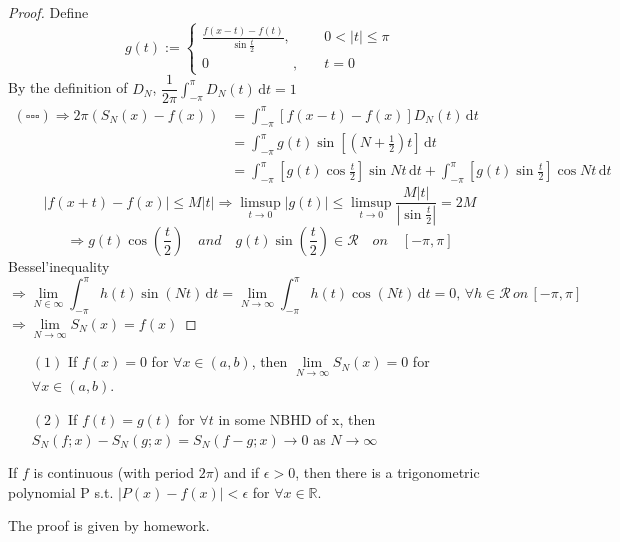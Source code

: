   \begin{proof}
    Define 
    \[g(t):=\left\{
        \begin{aligned}
            \frac{f(x-t)-f(t)}{\sin{\frac{t }{2 }}},&\quad0<|t| \leqslant \pi\\
            0\qquad\qquad\qquad,&\quad t=0
        \end{aligned}
    \right.\]
    By the definition of  $ D_N $,  $ \dfrac{1 }{2\pi}\int_{-\pi }^{\pi } D_N(t)\, \mathrm{d}t=1   $  
    \begin{align*}
        (\square\square\square)\Rightarrow 2\pi(S_N(x)-f(x))&=\int_{-\pi }^{\pi } [f(x-t)-f(x)]D_N(t)\, \mathrm{d}t\\
        &=\int_{-\pi}^{\pi }g(t)\sin[(N+\frac{1 }{2})t]\, \mathrm{d}t\\
        &=\int_{-\pi }^{\pi  }[g(t)\cos{\frac{t}{2}}]\sin{Nt} \, \mathrm{d}t+\int_{-\pi }^{\pi }[g(t)\sin{\frac{t}{2}}]\cos{Nt} \, \mathrm{d}t        
    \end{align*}
    \[|f(x+t)-f(x)| \leqslant M|t|\Rightarrow \limsup\limits_{t\to0}|g(t)| \leqslant \limsup\limits_{t\to0}\frac{M|t|}{|\sin{\frac{t }{2 }}|}=2M\]
    \[\Rightarrow g(t)\cos(\frac{t }{2})\quad and \quad g(t)\sin(\frac{ t}{2})\in \mathscr{R }\quad
    on\quad [-\pi, \pi]\]
    Bessel'inequality \[ \Rightarrow \lim\limits_{N\in\infty} \int_{-\pi }^{\pi } h(t)\sin(Nt)\, \mathrm{d}t=\lim\limits_{N\to\infty } \int_{-\pi}^{\pi } h(t)\cos(N t)\, \mathrm{d}t=0,\,\forall h\in\mathscr{R }\,on\,[-\pi,\pi]       \]
     $ \Rightarrow \lim\limits_{N\to\infty } S_N(x)=f(x)  $  
  \end{proof}
  \begin{corollary}
    \begin{enumerate}
        \item[$ (1) $] If $ f(x)=0  $ for  $ \forall x\in(a,b) $, then  $ \lim\limits_{N\to\infty } S_N(x)=0   $ for  $ \forall x\in(a,b) $.
        \item[$ (2) $] If  $ f(t)=g(t) $ for  $ \forall t $ in some NBHD of x, then  $ S_N(f;x)-S_N(g;x)=S_N(f-g;x)\rightarrow0  $ as  $ N\rightarrow\infty $     
    \end{enumerate}
  \end{corollary}
  \begin{theorem}
    If  $ f  $ is continuous (with period  $ 2\pi $) and if  $ \epsilon>0 $, then there is a trigonometric polynomial P s.t. $ |P(x)-f(x)|<\epsilon  $ for $ \forall x\in\mathbb{R } $.  
  \end{theorem}
  The proof is given by homework.
